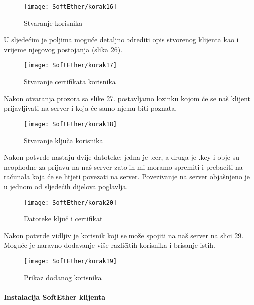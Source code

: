 \begin{figure}[h!]
     \centering
     \texttt{[image: SoftEther/korak16]}
     \caption{Stvaranje korisnika}
\end{figure}
\FloatBarrier
U sljedećim je poljima moguće detaljno odrediti opis stvorenog klijenta kao i vrijeme njegovog postojanja (slika 26).
\begin{figure}[h!]
     \centering
     \texttt{[image: SoftEther/korak17]}
     \caption{Stvaranje certifikata korisnika}
\end{figure}
\FloatBarrier
Nakon otvaranja prozora sa slike 27. postavljamo lozinku kojom će se naš klijent prijavljivati na server i koja će samo njemu biti poznata.
\begin{figure}[h!]
     \centering
     \texttt{[image: SoftEther/korak18]}
     \caption{Stvaranje ključa korisnika}
\end{figure}
\FloatBarrier
Nakon potvrde nastaju dvije datoteke: jedna je .cer, a druga je .key i obje su neophodne za prijavu na naš server zato ih mi moramo spremiti i prebaciti na računala koja će se htjeti povezati na server. Povezivanje na server objašnjeno je u jednom od sljedećih dijelova poglavlja.
\begin{figure}[h!]
     \centering
     \texttt{[image: SoftEther/korak20]}
     \caption{Datoteke ključ i certifikat}
\end{figure}
\FloatBarrier
Nakon potvrde vidljiv je korisnik koji se može spojiti na naš server na slici 29. Moguće je naravno dodavanje više različitih korisnika i brisanje istih.
\begin{figure}[h!]
     \centering
     \texttt{[image: SoftEther/korak19]}
     \caption{Prikaz dodanog korisnika}
\end{figure}
\FloatBarrier
\newpage
\paragraph*{Instalacija SoftEther klijenta}

